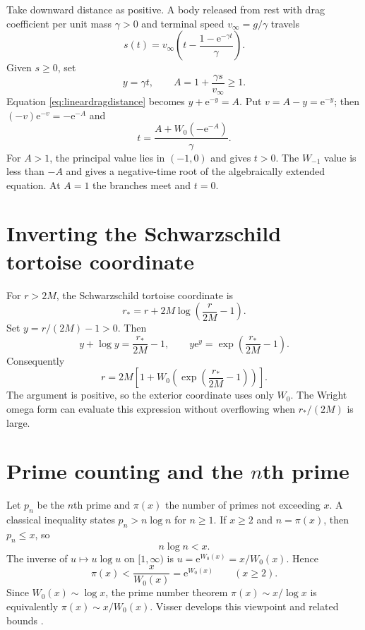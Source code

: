\documentclass[11pt,oneside]{book}
\theoremstyle{definition}
\theoremstyle{remark}
\newcommand{\ee}{\mathrm e}
\begin{document}
Take downward distance as positive.  A body released from rest with drag
coefficient per unit mass $\gamma>0$ and terminal speed
$v_\infty=g/\gamma$ travels
\begin{equation}\label{eq:lineardragdistance}
 s(t)=v_\infty\left(t-\frac{1-\ee^{-\gamma t}}{\gamma}\right).
\end{equation}
Given $s\ge0$, set
\[
 y=\gamma t,
 \qquad
 A=1+\frac{\gamma s}{v_\infty}\ge1.
\]
Equation \eqref{eq:lineardragdistance} becomes
$y+\ee^{-y}=A$.  Put $v=A-y=\ee^{-y}$; then
$(-v)\ee^{-v}=-\ee^{-A}$ and
\begin{equation}\label{eq:falltime}
 \boxed{
 t=\frac{A+W_0(-\ee^{-A})}{\gamma}.}
\end{equation}
For $A>1$, the principal value lies in $(-1,0)$ and gives $t>0$.
The $W_{-1}$ value is less than $-A$ and gives a negative-time root of the
algebraically extended equation.  At $A=1$ the branches meet and $t=0$.

\section{Inverting the Schwarzschild tortoise coordinate}

For $r>2M$, the Schwarzschild tortoise coordinate is
\begin{equation}\label{eq:tortoise}
 r_*=r+2M\log\left(\frac r{2M}-1\right).
\end{equation}
Set $y=r/(2M)-1>0$.  Then
\[
 y+\log y=\frac{r_*}{2M}-1,
 \qquad
 y\ee^y=\exp\!\left(\frac{r_*}{2M}-1\right).
\]
Consequently
\begin{equation}\label{eq:tortoiseinverse}
 \boxed{
 r=2M\left[1+W_0\!\left(
 \exp\!\left(\frac{r_*}{2M}-1\right)
 \right)\right].}
\end{equation}
The argument is positive, so the exterior coordinate uses only $W_0$.  The
Wright omega form can evaluate this expression without overflowing when
$r_*/(2M)$ is large.

\section{Prime counting and the $n$th prime}

Let $p_n$ be the $n$th prime and $\pi(x)$ the number of primes not exceeding
$x$.  A classical inequality states $p_n>n\log n$ for $n\ge1$.  If
$x\ge2$ and $n=\pi(x)$, then $p_n\le x$, so
\[
 n\log n<x.
\]
The inverse of $u\mapsto u\log u$ on $[1,\infty)$ is
$u=\ee^{W_0(x)}=x/W_0(x)$.  Hence
\begin{equation}\label{eq:primecountbound}
 \boxed{
 \pi(x)<\frac{x}{W_0(x)}=\ee^{W_0(x)}
 \qquad(x\ge2).}
\end{equation}
Since $W_0(x)\sim\log x$, the prime number theorem
$\pi(x)\sim x/\log x$ is equivalently
$\pi(x)\sim x/W_0(x)$.  Visser develops this viewpoint and related bounds
\cite{visser2018}.
\end{document}
